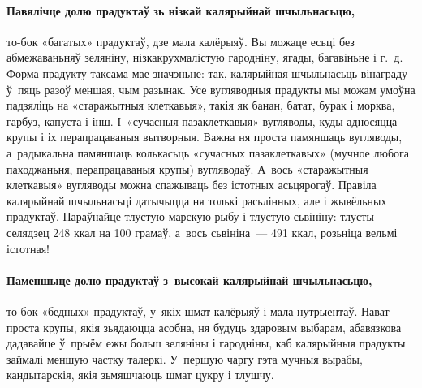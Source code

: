 \paragraph{Павялічце долю прадуктаў зь нізкай калярыйнай шчыльнасьцю,} то-бок «багатых» прадуктаў, дзе мала калёрыяў. Вы можаце есьці без абмежаваньняў зеляніну, нізкакрухмалістую гародніну, ягады, багавіньне і г.~д. Форма прадукту таксама мае значэньне: так, калярыйная шчыльнасьць вінаграду ў~пяць разоў меншая, чым разынак. Усе вугляводныя прадукты мы можам умоўна падзяліць на «старажытныя клеткавыя», такія як банан, батат, бурак і морква, гарбуз, капуста і інш. І~«сучасныя пазаклеткавыя» вугляводы, куды адносяцца крупы і іх перапрацаваныя вытворныя. Важна ня проста памяншаць вугляводы, а~радыкальна памяншаць колькасьць «сучасных пазаклеткавых» (мучное любога паходжаньня, перапрацаваныя крупы) вугляводаў. А~вось «старажытныя клеткавыя» вугляводы можна спажываць без істотных асьцярогаў. Правіла калярыйнай шчыльнасьці датычыцца ня толькі расьлінных, але і жывёльных прадуктаў. Параўнайце тлустую марскую рыбу і тлустую сьвініну: тлусты селядзец 248 ккал на 100 грамаў, а~вось сьвініна~--- 491 ккал, розьніца вельмі істотная!

\paragraph{Паменшыце долю прадуктаў з~высокай калярыйнай шчыльнасьцю,} то-бок «бедных» прадуктаў, у~якіх шмат калёрыяў і мала нутрыентаў. Нават проста крупы, якія зьядаюцца асобна, ня будуць здаровым выбарам, абавязкова дадавайце ў~прыём ежы больш зеляніны і гародніны, каб калярыйныя прадукты займалі меншую частку талеркі. У~першую чаргу гэта мучныя вырабы, кандытарскія, якія зьмяшчаюць шмат цукру і тлушчу.


